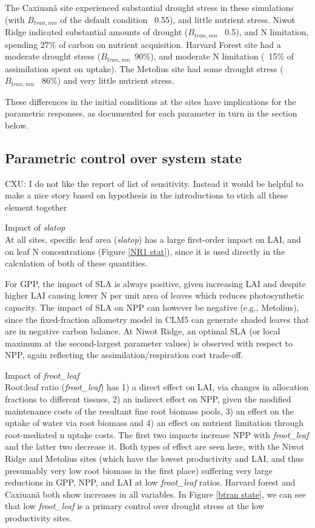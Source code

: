 \documentclass[draft,linenumbers]{agujournal}
\begin{document}
The Caxiuan\~a site experienced substantial drought stress in these simulations (with $B_{tran,mn}$ of the default condition ~0.55), and little nutrient stress. Niwot Ridge indicated substantial amounts of drought ($B_{tran,mn}$ ~0.5), and N limitation, spending 27\% of carbon on nutrient acquisition. Harvard Forest site had a moderate drought stress ($B_{tran,mn}$~90\%), and moderate N limitation (~15\% of assimilation spent on uptake). The Metolius site had some drought stress ($B_{tran,mn}$ ~86\%) and very little nutrient stress. 

These differences in the initial conditions at the sites have implications for the parametric responses, as documented for each parameter in turn in the section below. 

\subsection{Parametric control over system state}
{CXU: I do not like the report of list of sensitivity. Instead it would be helpful to make a nice story based on hypothesis in the introductions to stich all these element together}

Impact of \emph{slatop}\\
At all sites, specific leaf area (\emph{slatop}) has a large first-order impact on LAI,  and on leaf N concentrations (Figure \ref{NR1 stat}), since it is used directly in the calculation of both of these quantities.

For GPP, the impact of SLA is always positive, given increasing LAI and despite higher LAI causing lower N per unit area of leaves which reduces photosynthetic capacity. The impact of SLA on NPP can however be negative (e.g., Metolius), since the fixed-fraction allometry model in CLM5 can generate shaded leaves that are in negative carbon balance. At Niwot Ridge, an optimal SLA (or local maximum at the second-largest parameter values) is observed with respect to NPP, again reflecting the assimilation/respiration cost trade-off.

Impact of \emph{froot\_leaf}\\
Root:leaf ratio (\emph{froot\_leaf}) has 1) a direct effect on LAI, via changes in allocation fractions to different tissues, 2) an indirect effect on NPP, given the modified maintenance costs of the resultant fine root biomass pools, 3) an effect on the uptake of water via root biomass and 4) an effect on nutrient limitation through root-mediated n uptake costs.  The first two impacts increase NPP with \emph{froot\_leaf} and the latter two decrease it.  Both types of effect are seen here, with the Niwot Ridge and Metolius sites (which have the lowest productivity and LAI, and thus presumably very low root biomass in the first place) suffering very large reductions in GPP, NPP, and LAI at low \emph{froot\_leaf} ratios.  Harvard forest and Caxiuan\~a both show increases in all variables.  In Figure \ref{btran state}, we can see that low \emph{froot\_leaf} is a primary control over drought stress at the low productivity sites. 
\end{document}
